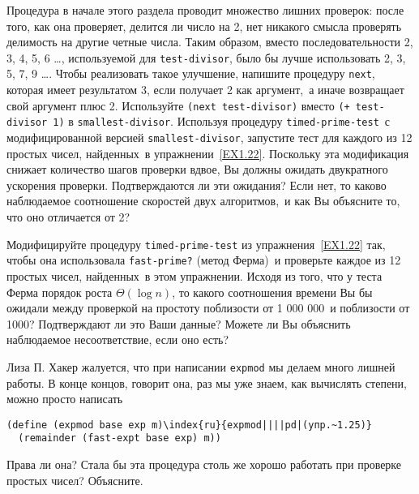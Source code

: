 \begin{exercise}{1.23}\label{EX1.23}%
Процедура  
в начале этого
раздела проводит множество лишних проверок: после того, как она
проверяет, делится ли число на 2, нет никакого смысла проверять
делимость на другие четные числа.  Таким образом, вместо
последовательности 2, 3, 4, 5, 6 \ldots, используемой для
{\tt test-divisor}, было бы лучше использовать 2, 3, 5, 7, 9
\ldots.  Чтобы реализовать такое улучшение, напишите процедуру {\tt next},
которая имеет результатом 3, если получает 2 как аргумент,~а иначе
возвращает свой аргумент плюс 2.  Используйте {\tt (next
test-divisor)} вместо {\tt (+ test-divisor 1)} в
{\tt smallest-divisor}.  Используя процедуру
{\tt timed-prime-test}~с модифицированной версией
{\tt smallest-divisor}, запустите тест для каждого из 12
простых чисел, найденных~в упражнении~\ref{EX1.22}.
Поскольку эта модификация снижает количество шагов проверки вдвое, Вы
должны ожидать двукратного ускорения проверки.  Подтверждаются ли эти
ожидания?  Если нет, то каково наблюдаемое соотношение скоростей двух
алгоритмов,~и как Вы объясните то, что оно отличается от 2?
\end{exercise}
\begin{exercise}{1.24}\label{EX1.24}%
Модифицируйте процедуру {\tt timed-prime-test} из
упражнения~\ref{EX1.22} так, чтобы она использовала
{\tt fast-prime?} (метод Ферма)~и проверьте каждое из 12
простых чисел, найденных~в этом упражнении.  Исходя из того, что у
теста Ферма порядок роста $\Theta (\log n)$, то какого
соотношения времени Вы бы ожидали между проверкой на простоту
поблизости от 1 000 000~и поблизости от 1000?  Подтверждают ли это
Ваши данные?  Можете ли Вы объяснить наблюдаемое несоответствие, если
оно есть?
\end{exercise}
\begin{exercise}{1.25}\label{EX1.25}%
Лиза П. Хакер жалуется, что при написании
{\tt expmod} мы делаем много лишней работы. В конце концов,
говорит она, раз мы уже знаем, как вычислять степени, можно просто
написать

\begin{Verbatim}
(define (expmod base exp m)\index{ru}{expmod||||pd|(упр.~1.25)}
  (remainder (fast-expt base exp) m))
\end{Verbatim}
Права ли она?  Стала бы эта процедура столь же хорошо работать при
проверке простых чисел?  Объясните.
\end{exercise}
